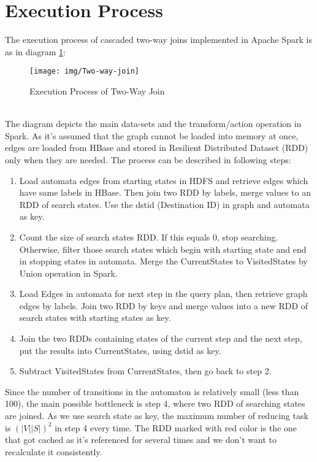 \section{Execution Process}
The execution process of cascaded two-way joins implemented in Apache Spark is as in diagram \ref{fig:two-way-join-spark}:
\begin{figure}[h!]
  \caption{Execution Process of Two-Way Join}
  \label{fig:two-way-join-spark}
  \centering
    \texttt{[image: img/Two-way-join]}
\end{figure}
\\The diagram depicts the main data-sets and the transform/action operation in Spark. As it's assumed that the graph cannot be loaded into memory at once, edges are loaded from HBase and stored in Resilient Distributed Dataset (RDD) only when they are needed. The process can be described in following steps: 
\begin{enumerate}
    \item Load automata edges from starting states in HDFS and retrieve edges which have same labels in HBase. Then join two RDD by labels, merge values to an RDD of search states. Use the dstid (Destination ID) in graph and automata as key.
    \item Count the size of search states RDD. If this equals 0, stop searching. Otherwise, filter those search states which begin with starting state and end in stopping states in automata. Merge the CurrentStates to VisitedStates by Union operation in Spark.
    \item Load Edges in automata for next step in the query plan, then retrieve graph edges by labels. Join two RDD by keys and merge values into a new RDD of search states with starting states as key.
    \item Join the two RDDs containing states of the current step and the next step, put the results into CurrentStates, using dstid as key.
    \item Subtract VisitedStates from CurrentStates, then go back to step 2.
\end{enumerate}
Since the number of transitions in the automaton is relatively small (less than 100), the main possible bottleneck is step 4, where two RDD of searching states are joined. As we use search state as key, the maximum number of reducing task is $(|V||S|)^2$ in step 4 every time. The RDD marked with red color is the one that got cached as it's referenced for several times and we don't want to recalculate it consistently.
